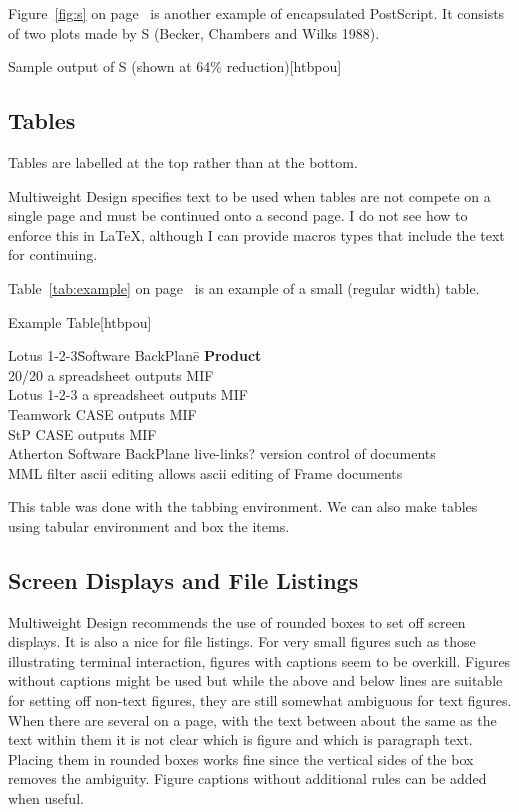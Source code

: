 Figure~\ref{fig:s} on page~\pageref{fig:s} is another example of encapsulated
PostScript.  It consists of two plots made by S (Becker, Chambers and
Wilks 1988).
\begin{capfigure}{\label{fig:s}Sample output of S (shown at 64\%
  reduction)}[htbpou] 
\center{
}
\end{capfigure}


\subsection{Tables}
Tables are labelled at the top rather than at the bottom. 

Multiweight Design specifies text to be used when tables are not compete on a 
single page and must be continued onto a second page. I do not see how to 
enforce this in \LaTeX, although I can provide macros types
that include the text for continuing.


Table~\ref{tab:example} on page~\pageref{tab:example} is an example of
a small (regular width) table.

\begin{captable}{\label{tab:example}Example Table}[htbpou]
\begin{tabbing}
Lotus 1-2-3\quad\=Software BackPlane\quad\=\kill
{\bf Product}\\
20/20\>	a spreadsheet\>	outputs MIF\\
Lotus 1-2-3\>	a spreadsheet\>	outputs MIF\\
Teamwork\>	CASE\>	outputs MIF\\
StP\>	CASE\>	outputs MIF\\
Atherton\>	Software BackPlane\>	live-links? version control of documents\\
MML filter\>	ascii editing\>	allows ascii editing of Frame documents\\
\end{tabbing}
\end{captable}

This table was done with the tabbing environment.  We can also make
tables using tabular environment and box the items.

\subsection{Screen Displays and File Listings}
Multiweight Design recommends the use of rounded boxes to set off
screen displays.  It is also a nice for file listings.  For very small
figures such as those illustrating terminal interaction, figures with
captions seem to be overkill.  Figures without captions might be used
but while the above and
below lines are suitable for setting off non-text figures, they
are still somewhat ambiguous for text figures.  When
there are several on a page, with the text between about the same as
the text within them it is not clear which is figure and which is
paragraph text.  Placing them in rounded boxes works fine since the
vertical sides of the box removes the ambiguity.  Figure captions
without additional rules can be added when useful.

